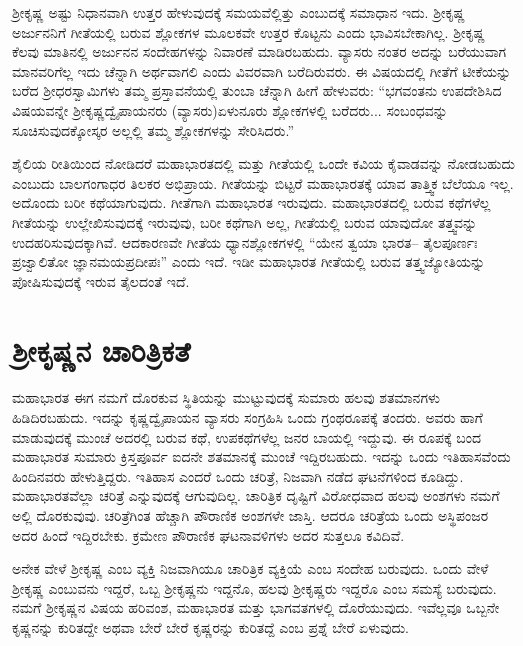 ಶ‍್ರೀಕೃಷ್ಣ ಅಷ್ಟು ನಿಧಾನವಾಗಿ ಉತ್ತರ ಹೇಳುವುದಕ್ಕೆ ಸಮಯವೆಲ್ಲಿತ್ತು ಎಂಬುದಕ್ಕೆ ಸಮಾಧಾನ ಇದು. ಶ‍್ರೀಕೃಷ್ಣ ಅರ್ಜುನನಿಗೆ ಗೀತೆಯಲ್ಲಿ ಬರುವ ಶ್ಲೋಕಗಳ ಮೂಲಕವೇ ಉತ್ತರ ಕೊಟ್ಟನು ಎಂದು ಭಾವಿಸಬೇಕಾಗಿಲ್ಲ. ಶ‍್ರೀಕೃಷ್ಣ ಕೆಲವು ಮಾತಿನಲ್ಲಿ ಅರ್ಜುನನ ಸಂದೇಹಗಳನ್ನು ನಿವಾರಣೆ ಮಾಡಿರಬಹುದು. ವ್ಯಾಸರು ನಂತರ ಅದನ್ನು ಬರೆಯುವಾಗ ಮಾನವರಿಗೆಲ್ಲ ಇದು ಚೆನ್ನಾಗಿ ಅರ್ಥವಾಗಲಿ ಎಂದು ವಿವರವಾಗಿ ಬರೆದಿರುವರು. ಈ ವಿಷಯದಲ್ಲಿ ಗೀತೆಗೆ ಟೀಕೆಯನ್ನು ಬರೆದ ಶ‍್ರೀಧರಸ್ವಾಮಿಗಳು ತಮ್ಮ ಪ್ರಸ್ತಾವನೆಯಲ್ಲಿ ತುಂಬಾ ಚೆನ್ನಾಗಿ ಹೀಗೆ ಹೇಳುವರು: “ಭಗವಂತನು ಉಪದೇಶಿಸಿದ ವಿಷಯವನ್ನೇ ಶ‍್ರೀಕೃಷ್ಣದ್ವೈಪಾಯನರು (ವ್ಯಾಸರು)ಏಳುನೂರು ಶ್ಲೋಕಗಳಲ್ಲಿ ಬರೆದರು... ಸಂಬಂಧವನ್ನು ಸೂಚಿಸುವುದಕ್ಕೋಸ್ಕರ ಅಲ್ಲಲ್ಲಿ ತಮ್ಮ ಶ್ಲೋಕಗಳನ್ನು ಸೇರಿಸಿದರು.”

ಶೈಲಿಯ ರೀತಿಯಿಂದ ನೋಡಿದರೆ ಮಹಾಭಾರತದಲ್ಲಿ ಮತ್ತು ಗೀತೆಯಲ್ಲಿ ಒಂದೇ ಕವಿಯ ಕೈವಾಡವನ್ನು ನೋಡಬಹುದು ಎಂಬುದು ಬಾಲಗಂಗಾಧರ ತಿಲಕರ ಅಭಿಪ್ರಾಯ. ಗೀತೆಯನ್ನು ಬಿಟ್ಟರೆ ಮಹಾಭಾರತಕ್ಕೆ ಯಾವ ತಾತ್ತ್ವಿಕ ಬೆಲೆಯೂ ಇಲ್ಲ. ಅದೊಂದು ಬರೀ ಕಥೆಯಾಗುವುದು. ಗೀತೆಗಾಗಿ ಮಹಾಭಾರತ ಇರುವುದು. ಮಹಾಭಾರತದಲ್ಲಿ ಬರುವ ಕಥೆಗಳೆಲ್ಲ ಗೀತೆಯನ್ನು ಉಲ್ಲೇಖಿಸುವುದಕ್ಕೆ ಇರುವುವು, ಬರೀ ಕಥೆಗಾಗಿ ಅಲ್ಲ, ಗೀತೆಯಲ್ಲಿ ಬರುವ ಯಾವುದೋ ತತ್ತ್ವವನ್ನು ಉದಹರಿಸುವುದಕ್ಕಾಗಿವೆ. ಆದಕಾರಣವೇ ಗೀತೆಯ ಧ್ಯಾನಶ್ಲೋಕಗಳಲ್ಲಿ “ಯೇನ ತ್ವಯಾ ಭಾರತ– ತೈಲಪೂರ್ಣಃ ಪ್ರಜ್ವಾಲಿತೋ ಜ್ಞಾನಮಯಪ್ರದೀಪಃ” ಎಂದು ಇದೆ. ಇಡೀ ಮಹಾಭಾರತ ಗೀತೆಯಲ್ಲಿ ಬರುವ ತತ್ತ್ವಜ್ಯೋತಿಯನ್ನು ಪೋಷಿಸುವುದಕ್ಕೆ ಇರುವ ತೈಲದಂತೆ ಇದೆ.


\section*{ಶ‍್ರೀಕೃಷ್ಣನ ಚಾರಿತ್ರಿಕತೆ}

ಮಹಾಭಾರತ ಈಗ ನಮಗೆ ದೊರಕುವ ಸ್ಥಿತಿಯನ್ನು ಮುಟ್ಟುವುದಕ್ಕೆ ಸುಮಾರು ಹಲವು ಶತಮಾನಗಳು ಹಿಡಿದಿರಬಹುದು. ಇದನ್ನು ಕೃಷ್ಣದ್ವೈಪಾಯನ ವ್ಯಾಸರು ಸಂಗ್ರಹಿಸಿ ಒಂದು ಗ್ರಂಥರೂಪಕ್ಕೆ ತಂದರು. ಅವರು ಹಾಗೆ ಮಾಡುವುದಕ್ಕೆ ಮುಂಚೆ ಅದರಲ್ಲಿ ಬರುವ ಕಥೆ, ಉಪಕಥೆಗಳೆಲ್ಲ ಜನರ ಬಾಯಲ್ಲಿ ಇದ್ದುವು. ಈ ರೂಪಕ್ಕೆ ಬಂದ ಮಹಾಭಾರತ ಸುಮಾರು ಕ್ರಿಸ್ತಪೂರ್ವ ಐದನೇ ಶತಮಾನಕ್ಕೆ ಮುಂಚೆ ಇದ್ದಿರಬಹುದು. ಇದನ್ನು ಒಂದು ಇತಿಹಾಸವೆಂದು ಹಿಂದಿನವರು ಹೇಳುತ್ತಿದ್ದರು. ಇತಿಹಾಸ ಎಂದರೆ ಒಂದು ಚರಿತ್ರೆ, ನಿಜವಾಗಿ ನಡೆದ ಘಟನೆಗಳಿಂದ ಕೂಡಿದ್ದು. ಮಹಾಭಾರತವೆಲ್ಲಾ ಚರಿತ್ರೆ ಎನ್ನುವುದಕ್ಕೆ ಆಗುವುದಿಲ್ಲ. ಚಾರಿತ್ರಿಕ ದೃಷ್ಟಿಗೆ ವಿರೋಧವಾದ ಹಲವು ಅಂಶಗಳು ನಮಗೆ ಅಲ್ಲಿ ದೊರಕುವುವು. ಚರಿತ್ರೆಗಿಂತ ಹೆಚ್ಚಾಗಿ ಪೌರಾಣಿಕ ಅಂಶಗಳೇ ಜಾಸ್ತಿ. ಆದರೂ ಚರಿತ್ರೆಯ ಒಂದು ಅಸ್ಥಿಪಂಜರ ಅದರ ಹಿಂದೆ ಇದ್ದಿರಬೇಕು. ಕ್ರಮೇಣ ಪೌರಾಣಿಕ ಘಟನಾವಳಿಗಳು ಅದರ ಸುತ್ತಲೂ ಕವಿದಿವೆ.

ಅನೇಕ ವೇಳೆ ಶ‍್ರೀಕೃಷ್ಣ ಎಂಬ ವ್ಯಕ್ತಿ ನಿಜವಾಗಿಯೂ ಚಾರಿತ್ರಿಕ ವ್ಯಕ್ತಿಯೆ ಎಂಬ ಸಂದೇಹ ಬರುವುದು. ಒಂದು ವೇಳೆ ಶ‍್ರೀಕೃಷ್ಣ ಎಂಬುವನು ಇದ್ದರೆ, ಒಬ್ಬ ಶ‍್ರೀಕೃಷ್ಣನು ಇದ್ದನೊ, ಹಲವು ಶ‍್ರೀಕೃಷ್ಣರು ಇದ್ದರೊ ಎಂಬ ಸಮಸ್ಯೆ ಬರುವುದು. ನಮಗೆ ಶ‍್ರೀಕೃಷ್ಣನ ವಿಷಯ ಹರಿವಂಶ, ಮಹಾಭಾರತ ಮತ್ತು ಭಾಗವತಗಳಲ್ಲಿ ದೊರೆಯುವುದು. ಇವೆಲ್ಲವೂ ಒಬ್ಬನೇ ಕೃಷ್ಣನನ್ನು ಕುರಿತದ್ದೇ ಅಥವಾ ಬೇರೆ ಬೇರೆ ಕೃಷ್ಣರನ್ನು ಕುರಿತದ್ದೆ ಎಂಬ ಪ್ರಶ್ನೆ ಬೇರೆ ಏಳುವುದು.

